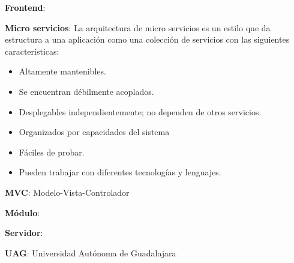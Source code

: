     \textbf{Frontend}:
    
    \textbf{Micro servicios}: La arquitectura de micro servicios es un estilo que da estructura a una aplicación como una colección de servicios con las siguientes características:
    
    \begin{itemize}
        \item Altamente mantenibles.
        \item Se encuentran débilmente acoplados.
        \item Desplegables independientemente; no dependen de otros servicios.
        \item Organizados por capacidades del sistema
        \item Fáciles de probar.
        \item Pueden trabajar con diferentes tecnologías y lenguajes.
    \end{itemize}
    
    \textbf{MVC}: Modelo-Vista-Controlador
    
    \textbf{Módulo}:
    
    \textbf{Servidor}: 
    
    \textbf{UAG}: Universidad Autónoma de Guadalajara